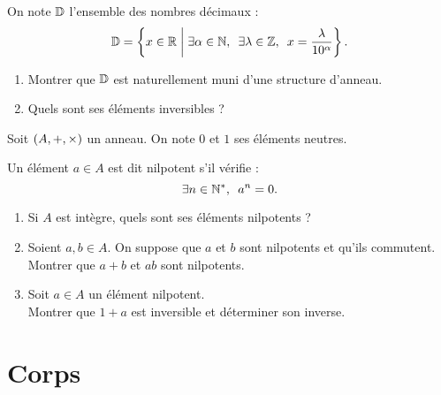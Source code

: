 \begin{corr}
\end{corr}

\begin{exo}
On note \(\mathbb{D}\) l'ensemble des nombres décimaux : \[\D=\accol{x\in\R\tq\quantifs{\exists\alpha\in\N;\exists\lambda\in\Z}x=\dfrac{\lambda}{10^\alpha}}.\]

\begin{enumerate}
\item Montrer que \(\mathbb{D}\) est naturellement muni d'une structure d'anneau. \\

\item Quels sont ses éléments inversibles ?
\end{enumerate}
\end{exo}

\begin{corr}
\end{corr}

\begin{exo}
Soit \(\anneau{A}\) un anneau. On note \(0\) et \(1\) ses éléments neutres.

Un élément \(a\in A\) est dit nilpotent s'il vérifie : \[\quantifs{\exists n\in\Ns}a^n=0.\]

\begin{enumerate}
\item Si \(A\) est intègre, quels sont ses éléments nilpotents ? \\

\item Soient \(a,b\in A\). On suppose que \(a\) et \(b\) sont nilpotents et qu'ils commutent. \\

Montrer que \(a+b\) et \(ab\) sont nilpotents. \\

\item Soit \(a\in A\) un élément nilpotent. \\

Montrer que \(1+a\) est inversible et déterminer son inverse.
\end{enumerate}
\end{exo}

\begin{corr}
\end{corr}

\section{Corps}

